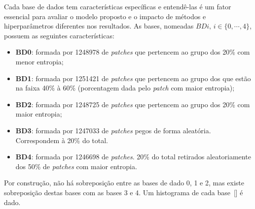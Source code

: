 Cada base de dados tem características específicas e entendê-las é um fator essencial para avaliar o modelo proposto e o impacto de métodos e hiperparâmetros diferentes nos resultados. As bases, nomeadas $BDi,\, i \in \{0,\cdots,4\}$, possuem as seguintes características:
\begin{itemize}
    \item \textbf{BD0}: formada por 1248978 de \textit{patches} que pertencem ao grupo dos 20\% com menor entropia;
    \item \textbf{BD1}: formada por 1251421 de \textit{patches} que pertencem ao grupo dos que estão na faixa 40\% à 60\% (porcentagem dada pelo \textit{patch} com maior entropia);
    \item \textbf{BD2}: formada por 1248725 de \textit{patches} que pertencem ao grupo dos 20\% com maior entropia;
    \item \textbf{BD3}: formada por 1247033 de \textit{patches} pegos de forma aleatória. Correspondem à 20\% do total.
    \item \textbf{BD4}: formada por 1246698 de \textit{patches}. 20\% do total retirados aleatoriamente dos 50\% de \textit{patches} com maior entropia.
\end{itemize}
Por construção, não há sobreposição entre as bases de dado 0, 1 e 2, mas existe sobreposição destas bases com as bases 3 e 4. Um histograma de cada base~[] é dado.
